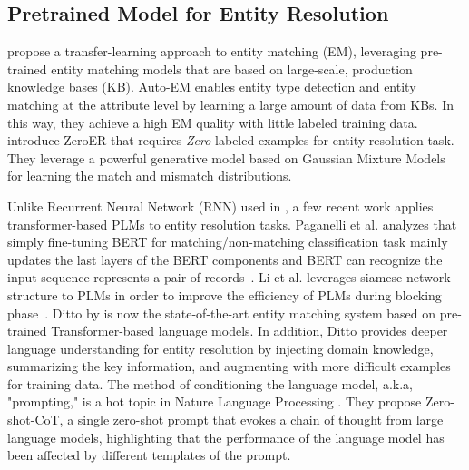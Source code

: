 
\subsection{Pretrained Model for Entity Resolution}

\cite{zhao_auto-em_2019} propose a transfer-learning approach to entity matching (EM), leveraging pre-trained entity matching models that are based on large-scale, production knowledge bases (KB). Auto-EM enables entity type detection and entity matching at the attribute level by learning a large amount of data from KBs. In this way, they achieve a high EM quality with little labeled training data. \cite{wu_zeroer_2020} introduce ZeroER that requires \textit{Zero} labeled examples for entity resolution task. They leverage a powerful generative model based on Gaussian Mixture Models for learning the match and mismatch distributions. 

Unlike Recurrent Neural Network (RNN) used in \cite{zhao_auto-em_2019, mudgal_deep_2018}, a few recent work applies transformer-based PLMs to entity resolution tasks. Paganelli et al. analyzes that simply fine-tuning BERT for matching/non-matching classification task mainly updates the last layers of the BERT components and BERT can recognize the input sequence represents a pair of records~\cite{paganelli_analyzing_2022}. Li et al. leverages siamese network structure to PLMs in order to improve the efficiency of PLMs during blocking phase~\cite{li_improving_2021}. 
Ditto by \cite{li_deep_2020} is now the state-of-the-art entity matching system based on pre-trained Transformer-based language models. In addition, Ditto provides deeper language understanding for entity resolution by injecting domain knowledge, summarizing the key information, and augmenting with more difficult examples for training data. The method of conditioning the language model, a.k.a, "prompting," is a hot topic in Nature Language Processing \cite{kojima_large_2022}. They \cite{kojima_large_2022} propose Zero-shot-CoT, a single zero-shot prompt that evokes a chain of thought from large language models, highlighting that the performance of the language model has been affected by different templates of the prompt. 
\vspace{-0.5em}
